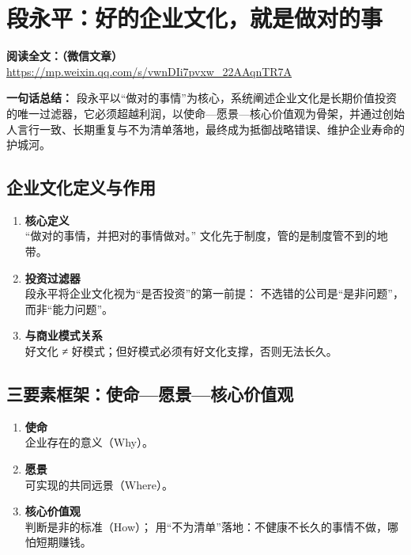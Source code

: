 \clearpage

\section{段永平：好的企业文化，就是做对的事}
\vspace{1cm}
\noindent\textbf{阅读全文：（微信文章）} \url{https://mp.weixin.qq.com/s/vwnDIi7pvxw_22AAqnTR7A}

\textbf{一句话总结：}  
段永平以“做对的事情”为核心，系统阐述企业文化是长期价值投资的唯一过滤器，它必须超越利润，以使命—愿景—核心价值观为骨架，并通过创始人言行一致、长期重复与不为清单落地，最终成为抵御战略错误、维护企业寿命的护城河。

\subsection{企业文化定义与作用}
\begin{enumerate}[leftmargin=*, nosep]
    \item \textbf{核心定义}  \\
    “做对的事情，并把对的事情做对。”  
    文化先于制度，管的是制度管不到的地带。
    \item \textbf{投资过滤器}  \\
    段永平将企业文化视为“是否投资”的第一前提：  
    不选错的公司是“是非问题”，而非“能力问题”。
    \item \textbf{与商业模式关系}  \\
    好文化 ≠ 好模式；但好模式必须有好文化支撑，否则无法长久。
\end{enumerate}

\subsection{三要素框架：使命—愿景—核心价值观}
\begin{enumerate}[leftmargin=*, nosep]
    \item \textbf{使命}  \\
    企业存在的意义（Why）。
    \item \textbf{愿景}  \\
    可实现的共同远景（Where）。
    \item \textbf{核心价值观}  \\
    判断是非的标准（How）；  
    用“不为清单”落地：不健康不长久的事情不做，哪怕短期赚钱。
\end{enumerate}

